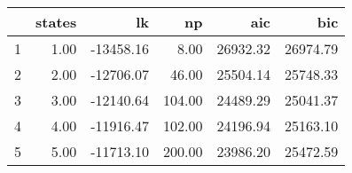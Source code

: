 \begin{table}[ht]
\centering
\begin{tabular}{rrrrrr}
  \hline
 & states & lk & np & aic & bic \\ 
  \hline
1 & 1.00 & -13458.16 & 8.00 & 26932.32 & 26974.79 \\ 
  2 & 2.00 & -12706.07 & 46.00 & 25504.14 & 25748.33 \\ 
  3 & 3.00 & -12140.64 & 104.00 & 24489.29 & 25041.37 \\ 
  4 & 4.00 & -11916.47 & 102.00 & 24196.94 & 25163.10 \\ 
  5 & 5.00 & -11713.10 & 200.00 & 23986.20 & 25472.59 \\ 
   \hline
\end{tabular}
\end{table}
